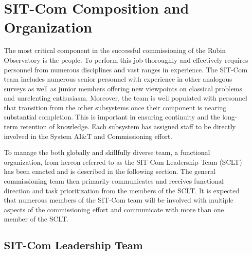 \documentclass[SE,lsstdraft,authoryear,toc]{lsstdoc}
\begin{document}
\section{SIT-Com Composition and Organization}
\label{sec:comp_and_org}

The most critical component in the successful commissioning of the Rubin Observatory is the people.
To perform this job thoroughly and effectively requires personnel from numerous disciplines and vast ranges in experience.
The SIT-Com team includes numerous senior personnel with experience in other analogous surveys as well as junior members offering new viewpoints on classical problems and unrelenting enthusiasm.
Moreover, the team is well populated with personnel that transition from the other subsystems once their component is nearing substantial completion.
This is important in ensuring continuity and the long-term retention of knowledge.
Each subsystem has assigned staff to be directly involved in the System AI\&T and Commissioning effort.

To manage the both globally and skillfully diverse team, a functional organization, from hereon referred to as the SIT-Com Leadership Team (SCLT) has been enacted and is described in the following section.
The general commissioning team then primarily communicates and receives functional direction and task prioritization from the members of the SCLT.
It is expected that numerous members of the SIT-Com team will be involved with multiple aspects of the commissioning effort and communicate with more than one member of the SCLT.
%



\subsection{SIT-Com Leadership Team}
\label{sec:SCLT}
\end{document}
